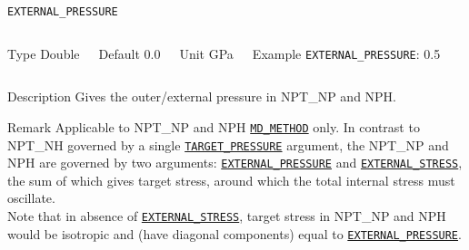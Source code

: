 \begin{frame}[allowframebreaks]{\texttt{EXTERNAL\_PRESSURE}} \label{EXTERNAL_PRESSURE}
\vspace*{-12pt}
\begin{columns}
\begin{block}{Type}
Double
\end{block}

\begin{block}{Default}
0.0
\end{block}

\begin{block}{Unit}
GPa
\end{block}

\begin{block}{Example}
\texttt{EXTERNAL\_PRESSURE}: 0.5
\end{block}
\end{columns}

\begin{block}{Description}
Gives the outer/external pressure in NPT\_NP and NPH.
\end{block}

\begin{block}{Remark}
Applicable to NPT\_NP and NPH \hyperlink{MD_METHOD}{\texttt{MD\_METHOD}} only. In contrast to NPT\_NH governed by a single \hyperlink{TARGET_PRESSURE}{\texttt{TARGET\_PRESSURE}} argument, the NPT\_NP and NPH are governed by two arguments: \hyperlink{EXTERNAL_PRESSURE}{\texttt{EXTERNAL\_PRESSURE}} and \hyperlink{EXTERNAL_STRESS}{\texttt{EXTERNAL\_STRESS}}, the sum of which gives target stress, around which the total internal stress must oscillate.  
\\
Note that in absence of \hyperlink{EXTERNAL_STRESS}{\texttt{EXTERNAL\_STRESS}}, target stress in NPT\_NP and NPH would be isotropic and (have diagonal components) equal to \hyperlink{EXTERNAL_PRESSURE}{\texttt{EXTERNAL\_PRESSURE}}. 


\end{block}

\end{frame}



